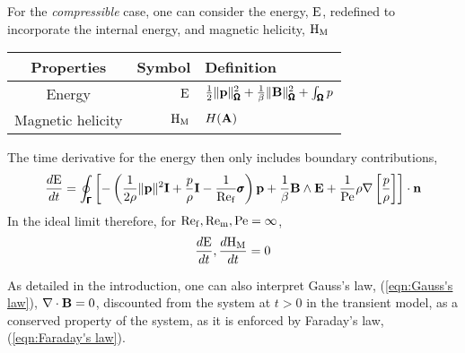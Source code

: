    For the \emph{compressible} case, one can consider the energy, $\mathrm{E}$, redefined to incorporate the internal energy, and magnetic helicity, $\mathrm{H}_{\mathrm{M}}$
    \begin{center}\begin{tabular}{ c | r l }
        Properties  &  Symbol  &  Definition  \\
        \hline\hline
        Energy  &  $\mathrm{E}$  &  $\frac{1}{2}\|\mathbf{p}\|_{\pmb{\mathsf{\Omega}}}^{2} + \frac{1}{\beta}\|\mathbf{B}\|_{\pmb{\mathsf{\Omega}}}^{2} + \int_{\pmb{\mathsf{\Omega}}}p$  \\
        Magnetic helicity  &  $\mathrm{H}_{\mathrm{M}}$  &  $H(\mathbf{A})$
    \end{tabular}\end{center}
     The time derivative for the energy then only includes boundary contributions, 
    \begin{equation}
        \frac{d\mathrm{E}}{dt}  =  \oint_{\pmb{\mathsf{\Gamma}}}\left[- \left(\frac{1}{2\rho}\|\mathbf{p}\|^{2}\mathbf{I} + \frac{p}{\rho}\mathbf{I} - \frac{1}{\mathrm{Re}_{\mathrm{f}}}\pmb{\mathsf{\sigma}}\right)\mathbf{p} + \frac{1}{\beta}\mathbf{B}\wedge\mathbf{E} + \frac{1}{\mathrm{Pe}}\rho\nabla\left[\frac{p}{\rho}\right]\right]\cdot\mathbf{n}
    \end{equation}
    In the ideal limit therefore, for $\mathrm{Re}_{\mathrm{f}}, \mathrm{Re}_{\mathrm{m}}, \mathrm{Pe}  =  \infty$,
    \begin{equation}
        \frac{d\mathrm{E}}{dt}, \frac{d\mathrm{H}_{\mathrm{M}}}{dt}  =  0
    \end{equation}

    As detailed in the introduction, one can also interpret Gauss's law, (\ref{eqn:Gauss's law}), $\nabla\cdot\mathbf{B}  =  0$, discounted from the system at $t  >  0$ in the transient model, as a conserved property of the system, as it is enforced by Faraday's law, (\ref{eqn:Faraday's law}).
    